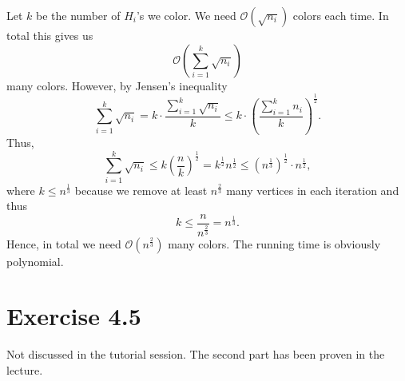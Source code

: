 \documentclass[oneside,a4paper]{amsart}
\begin{document}
Let $k$ be the number of $H_i$'s we color. We need $\mathcal{O}(\sqrt{n_i})$ colors each time. In total this gives us
\[
	\mathcal{O} \left( \sum_{i=1}^k \sqrt{n_i} \right)
\] 
many colors.
However, by Jensen's inequality
\[
	\sum_{i=1}^k \sqrt{n_i} = k \cdot \frac{\sum_{i=1}^k \sqrt{n_i}}{k} \leq k \cdot \left( \frac{\sum_{i=1}^k n_i}{k} \right)^\frac{1}{2}.
\]
Thus,
\[
	\sum_{i=1}^k \sqrt{n_i} \leq k \left( \frac{n}{k} \right)^\frac{1}{2} = k^\frac{1}{2} n^\frac{1}{2} \leq \left( n^\frac{1}{3} \right)^\frac{1}{2} \cdot n^\frac{1}{2},
\]
where $k \leq n^\frac{1}{3}$ because we remove at least $n^\frac{2}{3}$ many vertices in each iteration and thus
\[
	k \leq \frac{n}{n^\frac{2}{3}} = n^\frac{1}{3}.
\]
Hence, in total we need $\mathcal{O}(n^\frac{2}{3})$ many colors.
The running time is obviously polynomial.
\section*{Exercise 4.5}
Not discussed in the tutorial session. The second part has been proven in the lecture.
\end{document}
